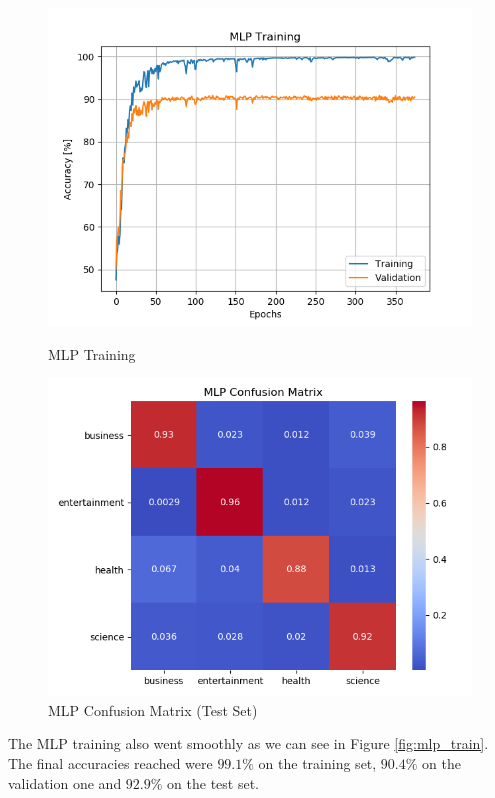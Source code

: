 \documentclass[10pt,a4paper]{report}
\begin{document}
\begin{figure}
    \centering
    \begin{minipage}{0.45\textwidth}
        \centering
        \includegraphics[width=\textwidth]{mlp_training.png} %
        \caption{MLP Training}
        \label{fig:mlp_train}
    \end{minipage}\hfill
    \begin{minipage}{0.45\textwidth}
        \centering
        \includegraphics[width=\textwidth]{mlp_confmat.png} %
        \caption{MLP Confusion Matrix (Test Set)}
        \label{fig:mlp_confmat}
    \end{minipage}
\end{figure}
The MLP training also went smoothly as we can see in Figure \ref{fig:mlp_train}. The final accuracies reached were $99.1 \%$ on the training set, $90.4 \%$ on the validation one and $92.9 \%$ on the test set.
\end{document}

